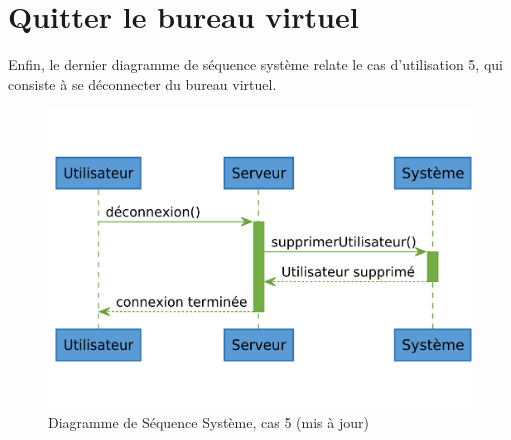 \section{Quitter le bureau virtuel}

Enfin, le dernier diagramme de séquence système relate le cas d'utilisation
5, qui consiste à se déconnecter du bureau virtuel.

\begin{figure}[h!]
	\centering
	\includegraphics[scale=0.4]{diagrammes/dss5.pdf}
	\caption{\color{green}Diagramme de Séquence Système, cas 5 (mis à jour)\color{black}}
\end{figure}
